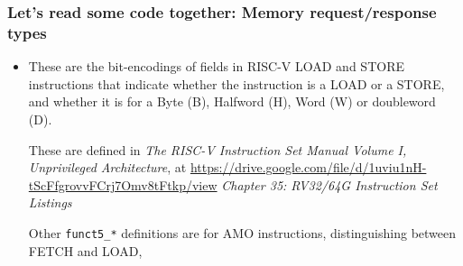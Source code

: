 
\begin{frame}[fragile]
\frametitle{Let's read some code together: Memory request/response types}

\begin{center}\scriptsize


 \vspace*{5ex}

 \begin{minipage}{0.8\textwidth}
  \begin{itemize}

   \item These are the bit-encodings of fields in RISC-V LOAD and
     STORE instructions that indicate whether the instruction is a
     LOAD or a STORE, and whether it is for a Byte (B), Halfword (H),
     Word (W) or doubleword (D).

    \vspace*{2ex}

    These are defined in \emph{The RISC-V Instruction Set Manual
    Volume I, Unprivileged Architecture}, at
    \url{https://drive.google.com/file/d/1uviu1nH-tScFfgrovvFCrj7Omv8tFtkp/view}
    \emph{Chapter 35: RV32/64G Instruction Set Listings}

    \vspace*{5ex}

    {\tiny Other {\tt funct5\_*} definitions are for AMO instructions,
    distinguishing between FETCH and LOAD, {\etc}}

  \end{itemize}

 \end{minipage}
\end{center}

\end{frame}

